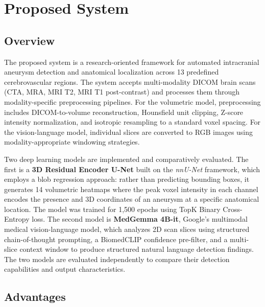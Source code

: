 \documentclass[twoside,a4paper,openright]{report} %
\begin{document}
\newpage

\section{Proposed System}

\subsection{Overview}

\hspace{1.5cm}
The proposed system is a research-oriented framework for automated intracranial aneurysm detection and anatomical localization across 13 predefined cerebrovascular regions. The system accepts multi-modality DICOM brain scans (CTA, MRA, MRI T2, MRI T1 post-contrast) and processes them through modality-specific preprocessing pipelines. For the volumetric model, preprocessing includes DICOM-to-volume reconstruction, Hounsfield unit clipping, Z-score intensity normalization, and isotropic resampling to a standard voxel spacing. For the vision-language model, individual slices are converted to RGB images using modality-appropriate windowing strategies.

Two deep learning models are implemented and comparatively evaluated. The first is a \textbf{3D Residual Encoder U-Net} built on the \textit{nnU-Net} framework, which employs a blob regression approach: rather than predicting bounding boxes, it generates 14 volumetric heatmaps where the peak voxel intensity in each channel encodes the presence and 3D coordinates of an aneurysm at a specific anatomical location. The model was trained for 1,500 epochs using TopK Binary Cross-Entropy loss. The second model is \textbf{MedGemma 4B-it}, Google's multimodal medical vision-language model, which analyzes 2D scan slices using structured chain-of-thought prompting, a BiomedCLIP confidence pre-filter, and a multi-slice context window to produce structured natural language detection findings. The two models are evaluated independently to compare their detection capabilities and output characteristics.

\subsection{Advantages}

\hspace{1.5cm}
\end{document}
